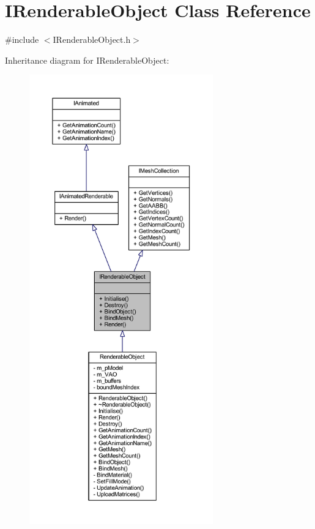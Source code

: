 \hypertarget{class_i_renderable_object}{}\section{I\+Renderable\+Object Class Reference}
\label{class_i_renderable_object}


{\ttfamily \#include $<$I\+Renderable\+Object.\+h$>$}



Inheritance diagram for I\+Renderable\+Object\+:
\nopagebreak
\begin{figure}[H]
\begin{center}
\leavevmode
\includegraphics[height=550pt]{class_i_renderable_object__inherit__graph}
\end{center}
\end{figure}


